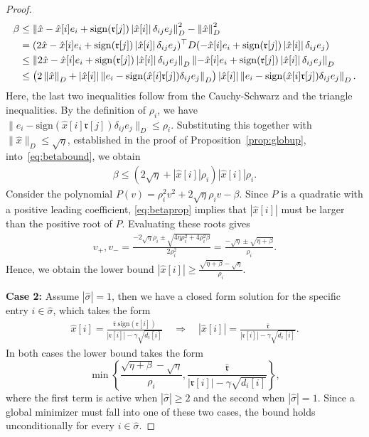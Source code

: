 \documentclass[10pt,a4paper]{amsart}
\newcommand{\abs}[1]{\left\lvert#1\right\rvert}
\newcommand{\ccr}{{\mathfrak r}}
\newcommand{\norm}[1]{\left\lVert#1\right\rVert}
\newcommand{\tpose}[1]{#1^{\top}}
\begin{document}
\begin{proof}
\begin{align}
   \notag \beta &\leq \norm{\hat{x}-\hat{x}[i]e_i+\mathrm{sign}(\ccr[j])\abs{\hat{x}[i]}\delta_{ij}e_j}_D^2-\norm{\hat{x}}_D^2\\&\notag=\tpose{(2\hat{x}-\hat{x}[i]e_i+\mathrm{sign}(\ccr[j])\abs{\hat{x}[i]}\delta_{ij}e_j)}D(-\hat{x}[i]e_i+\mathrm{sign}(\ccr[j])\abs{\hat{x}[i]}\delta_{ij}e_j)\\&
    \leq \norm{2\hat{x}-\hat{x}[i]e_i+\mathrm{sign}(\ccr[j])\abs{\hat{x}[i]}\delta_{ij}e_j}_D\norm{-\hat{x}[i]e_i+\mathrm{sign}(\ccr[j])\abs{\hat{x}[i]}\delta_{ij}e_j}_D\\
    &\notag \leq\left(2\norm{\hat{x}}_D+\abs{\hat{x}[i]}\norm{e_i-\mathrm{sign}(\hat{x}[i]\ccr[j])\delta_{ij}e_j}_D\right)\abs{\hat{x}[i]}\norm{e_i-\mathrm{sign}(\hat{x}[i]\ccr[j])\delta_{ij}e_j}_D.
\end{align}
Here, the last two inequalities follow from the Cauchy-Schwarz and the triangle inequalities. By the definition of $\rho_i$, we have $ \|e_i-\mathrm{sign}(\hat{x}[i]\ccr[j])\delta_{ij}e_j\|_D\leq \rho_i$. Substituting this together with $\|\hat x\|_D\leq \sqrt{\eta}$, established in the proof of Proposition~\ref{prop:globup}, into~\eqref{eq:betabound}, we obtain
 \begin{align}
 \label{eq:betaprop}
     \beta\leq (2\sqrt{\eta}+\abs{\hat{x}[i]}\rho_i)\abs{\hat{x}[i]}\rho_i.
 \end{align}
 Consider the polynomial $P(v)= \rho_i^2v^2+2\sqrt{\eta}\rho_i v-\beta$. Since $P$ is a quadratic with a positive leading coefficient, \eqref{eq:betaprop} implies that $|\hat x[i]|$ must be larger than the positive root of $P$. Evaluating these roots gives
 \begin{align*}
     v_+,v_-=\frac{-2\sqrt{\eta}\rho_i\pm\sqrt{4\eta\rho_i^2+4\rho_i^2\beta}}{2\rho_i^2}=\frac{-\sqrt{\eta}\pm\sqrt{\eta+\beta}}{\rho_i}.
 \end{align*}
 Hence, we obtain the lower bound $\abs{\hat{x}[i]}\geq \frac{\sqrt{\eta+\beta}-\sqrt{\eta}}{\rho_i}$.

 \textbf{Case 2: } Assume $\abs{\hat{\sigma}}=1$, then we have a closed form solution for the specific entry $i\in\hat{\sigma}$, which takes the form
\begin{align*}
    \hat{x}[i]=\frac{\bar{\ccr}\;\mathrm{sign}(\ccr[i])}{\abs{\ccr[i]}-\gamma\sqrt{d_i[i]}}\quad\Rightarrow\quad \abs{\hat{x}[i]}=\frac{\bar{\ccr}}{\abs{\ccr[i]}-\gamma\sqrt{d_i[i]}}.
\end{align*}
In both cases the lower bound takes the form
\[
    \min\left\{ \frac{\sqrt{\eta+\beta}-\sqrt{\eta}}{\rho_i},\frac{\bar{\ccr}}{\abs{\ccr[i]}-\gamma\sqrt{d_i[i]}}\right\},
\] where the first term is active when $\abs{\hat{\sigma}}\geq2$ and the second when $\abs{\hat{\sigma}}=1$. Since a global minimizer must fall into one of these two cases, the bound holds unconditionally for every $i\in\hat{\sigma}$.
 \end{proof}
\end{document}
